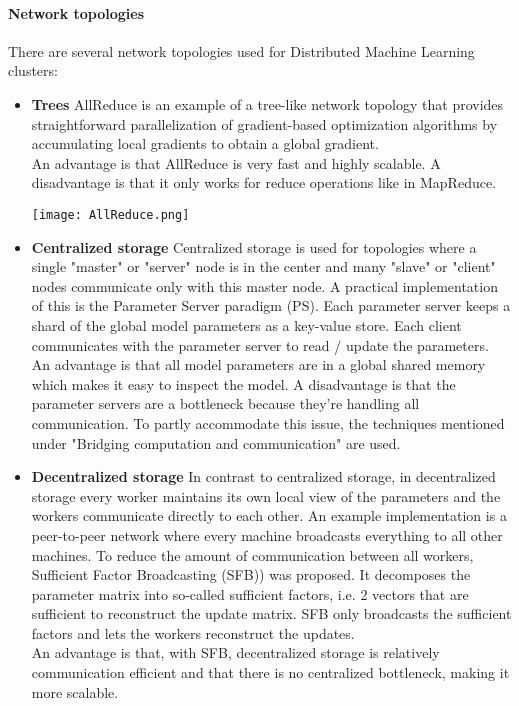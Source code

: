 \paragraph{Network topologies}
There are several network topologies used for Distributed Machine Learning clusters:
\begin{itemize}
	\item \textbf{Trees} AllReduce\cite{Agar14} is an example of a tree-like network topology that provides straightforward parallelization of gradient-based optimization algorithms by accumulating local gradients to obtain a global gradient.\\
	An advantage is that AllReduce is very fast and highly scalable. A disadvantage is that it only works for reduce operations like in MapReduce.
	\begin{minipage}{\linewidth}
		\centering
		\texttt{[image: AllReduce.png]}
	\end{minipage}
	\item \textbf{Centralized storage} Centralized storage is used for topologies where a single "master" or "server" node is in the center and many "slave" or "client" nodes communicate only with this master node. A practical implementation of this is the Parameter Server paradigm (PS). Each parameter server keeps a shard of the global model parameters as a key-value store. Each client communicates with the parameter server to read / update the parameters. \\
	An advantage is that all model parameters are in a global shared memory which makes it easy to inspect the model. A disadvantage is that the parameter servers are a bottleneck because they're handling all communication. To partly accommodate this issue, the techniques mentioned under "Bridging computation and communication" are used.
	\item \textbf{Decentralized storage} In contrast to centralized storage, in decentralized storage every worker maintains its own local view of the parameters and the workers communicate directly to each other. An example implementation is a peer-to-peer network where every machine broadcasts everything to all other machines. To reduce the amount of communication between all workers, Sufficient Factor Broadcasting (SFB)\cite{Li13}) was proposed. It decomposes the parameter matrix into so-called sufficient factors, i.e. 2 vectors that are sufficient to reconstruct the update matrix. SFB only broadcasts the sufficient factors and lets the workers reconstruct the updates.\\
	An advantage is that, with SFB, decentralized storage is relatively communication efficient and that there is no centralized bottleneck, making it more scalable.
\end{itemize}










